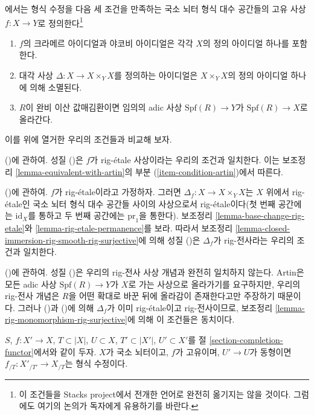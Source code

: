 \begin{remark}
\label{remark-compare-formal-modification-artin}
\cite[Definition 1.7]{ArtinII}에서는 형식 수정을 다음 세 조건을 만족하는
국소 뇌터 형식 대수 공간들의 고유 사상
$f : X \to Y$로 정의한다\footnote{이 조건들을 Stacks project에서
전개한 언어로 완전히 옮기지는 않을 것이다. 그럼에도 여기의 논의가
독자에게 유용하기를 바란다.}
\begin{enumerate}
\item[(\romannumeral1)] $f$의 크라메르 아이디얼과 야코비 아이디얼은
각각 $X$의 정의 아이디얼 하나를 포함한다.
\item[(\romannumeral2)] 대각 사상
$\Delta : X \to X \times_Y X$를 정의하는 아이디얼은
$X \times_Y X$의 정의 아이디얼 하나에 의해 소멸된다.
\item[(\romannumeral3)] $R$이 완비 이산 값매김환이면 임의의 adic 사상
$\text{Spf}(R) \to Y$가 $\text{Spf}(R) \to X$로 올라간다.
\end{enumerate}
이를 위에 열거한 우리의 조건들과 비교해 보자.

\medskip\noindent
()에 관하여. 성질 ()은 $f$가
rig-\'etale 사상이라는 우리의 조건과 일치한다. 이는 보조정리
\ref{lemma-equivalent-with-artin}의 부분
(\ref{item-condition-artin})에서 따른다.

\medskip\noindent
()에 관하여. $f$가 rig-\'etale이라고 가정하자.
그러면 $\Delta_f : X \to X \times_Y X$는 $X$ 위에서
rig-\'etale인 국소 뇌터 형식 대수 공간들 사이의 사상으로서
rig-\'etale이다(첫 번째 공간에는 $\text{id}_X$를 통하고 두 번째
공간에는 $\text{pr}_1$을 통한다).
보조정리 \ref{lemma-base-change-rig-etale}와
\ref{lemma-rig-etale-permanence}를 보라.
따라서 보조정리
\ref{lemma-closed-immersion-rig-smooth-rig-surjective}에 의해
성질 ()은 $\Delta_f$가 rig-전사라는 우리의 조건과 일치한다.

\medskip\noindent
()에 관하여. 성질 ()은 우리의
rig-전사 사상 개념과 완전히 일치하지 않는다. Artin은 모든 adic 사상
$\text{Spf}(R) \to Y$가 $X$로 가는 사상으로 올라가기를 요구하지만,
우리의 rig-전사 개념은 $R$을 어떤 확대로 바꾼 뒤에 올라감이 존재한다고만
주장하기 때문이다. 그러나 ()과 ()에 의해
$\Delta_f$가 이미 rig-\'etale이고 rig-전사이므로, 보조정리
\ref{lemma-rig-monomorphism-rig-surjective}에 의해 이 조건들은 동치이다.
\end{remark}

\begin{lemma}
\label{lemma-modification-gives-formal-modification}
$S$, $f : X' \to X$, $T \subset |X|$, $U \subset X$,
$T' \subset |X'|$, $U' \subset X'$를 절
\ref{section-completion-functor}에서와 같이 두자.
$X$가 국소 뇌터이고, $f$가 고유이며, $U' \to U$가 동형이면
$f_{/T} : X'_{/T'} \to X_{/T}$는 형식 수정이다.
\end{lemma}

